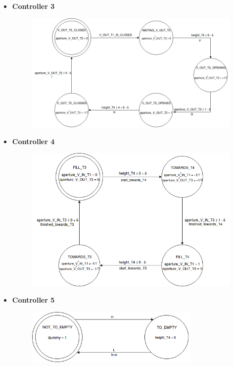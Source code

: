 \documentclass[12pt]{article}
\begin{document}
\begin{itemize}
	\newpage
	\item \textbf{Controller 3}
	\begin{figure}[H]
	\begin{center}
	\includegraphics[width=1\textwidth]{images/controller3.png}
	\end{center}
	\end{figure}
	
	\newpage
	\item \textbf{Controller 4}
	\begin{figure}[H]
	\begin{center}
	\includegraphics[width=1\textwidth]{images/controller4.png}
	\end{center}
	\end{figure}
	
	\item \textbf{Controller 5}
	\begin{figure}[H]
	\begin{center}
	\includegraphics[width=0.8\textwidth]{images/controller5.png}
	\end{center}
	\end{figure}
	

\end{itemize}
\end{document}
